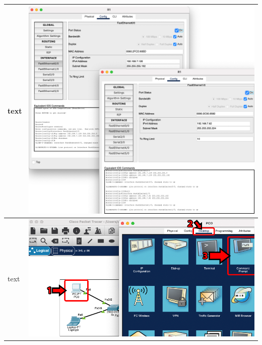 \documentclass[11pt,a4paper]{report}
\begin{document}
\begin{flushleft}
\begin{center}
\begin{longtable}{ m{5cm} l }
                        text & \includegraphics[scale=0.31,valign=c]{phase2/images/p2-connecting2lanswithrouter/R1-interfaces} \\ \hline
                        text & \includegraphics[scale=0.35,valign=c]{phase2/images/p1-connectingdevices/CiscoPacketTracer_cmdOutput} \\ \hline

\end{longtable}
\end{center}
\end{flushleft}
\end{document}
